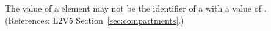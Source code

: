 The value of a  element may not be the identifier of a
\Compartment with a  value
of .
(References: L2V5 Section~\ref{sec:compartments}.)

